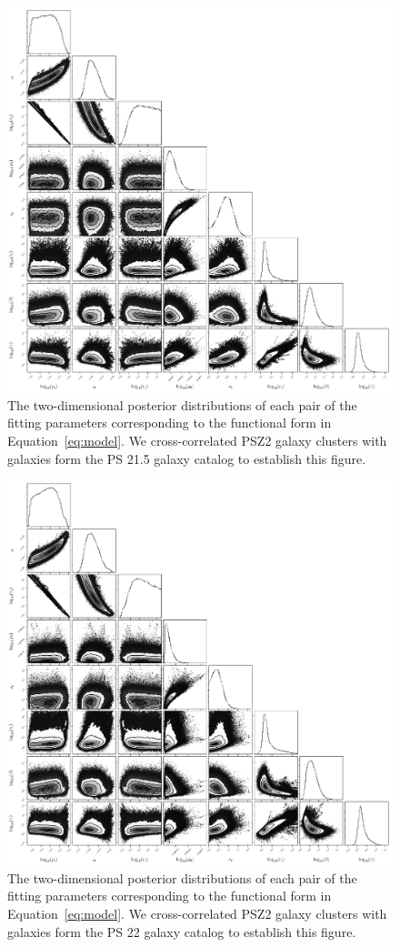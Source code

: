 \documentclass[iop, apjl, twocolappendix, numberedappendix]{emulateapj}
\begin{document}
\begin{figure}
    \includegraphics[width= \textwidth]{corner215.pdf}
\caption{The two-dimensional posterior distributions of each pair of
the fitting parameters corresponding to the functional
form in Equation~\ref{eq:model}. We cross-correlated PSZ2 galaxy clusters with
galaxies form the PS 21.5 galaxy catalog to establish this figure.}
   \label{fig:corner_21.5} 
\end{figure}
\begin{figure}
    \includegraphics[width= \textwidth]{corner22.pdf}
\caption{The two-dimensional posterior distributions of each pair of
the fitting parameters corresponding to the functional
form in Equation~\ref{eq:model}. We cross-correlated PSZ2 galaxy clusters with
galaxies form the PS 22 galaxy catalog to establish this figure.}
   \label{fig:corner_22} 
\end{figure}
\end{document}

